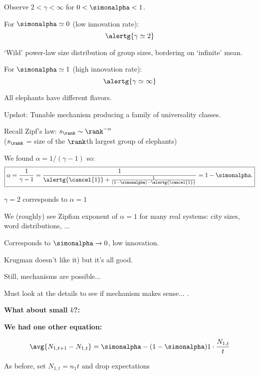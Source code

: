     Observe $2 < \gamma < \infty $ for  $0 < \simonalpha < 1$.
   
    For $\simonalpha \simeq 0$ (low innovation rate):\\
    $$\alertg{\gamma \simeq 2}$$
   
    `Wild' power-law size distribution of group sizes, 
    bordering on `infinite' mean.
   
    For $\simonalpha \simeq 1$ (high innovation rate):\\
    $$\alertg{\gamma \simeq \infty}$$
   
    All elephants have different flavors.
   
    Upshot: Tunable mechanism producing 
    a family of universality classes.
  
  



  
  
   
    Recall Zipf's law: $s_\rank \sim \rank^{-\alpha}$\\
    ($s_\rank$ = size of the $\rank$th largest group of elephants)
   
    We found $\alpha = 1/(\gamma-1)$ so:
    $$
    \boxed{
      \alpha 
      = 
      \frac{1}{\gamma-1}
      = 
      \frac{1}
      {\alertg{\cancel{1}} + \frac{1}{(1-\simonalpha) - \alertg{\cancel{1}}}}
      =
      1 - \simonalpha.
    }
    $$
   
    $\gamma = 2$ corresponds to $\alpha = 1$
   
    We (roughly) see Zipfian exponent\cite{zipf1949a} 
    of $\alpha=1$ for many real systems:
    city sizes, word distributions, ...
   
    Corresponds to $\simonalpha \rightarrow 0$, low innovation.
   
    Krugman doesn't like it)\cite{krugman1995a}
    but it's all good.
   
    Still,  mechanisms are possible...
   
    Must look at the details to see if mechanism makes sense...  
    {.}
  
  


  \textbf{What about small $k$?:}

  \textbf{We had one other equation:}
    
   
    $$
    \avg{N_{1,t+1} - N_{1,t}}
    =
    \simonalpha
    -(1-\simonalpha)
    1\cdot\frac{N_{1,t}}{t}
    $$
   
    As before, set $N_{1,t} = n_1 t$ and drop expectations
   
